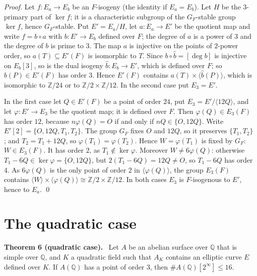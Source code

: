 \documentclass[11pt]{article}
\newenvironment{statement}[1]{\par\medskip\noindent\phantomsection\textbf{#1}\ }{\par\medskip}
\newcommand{\Q}{\mathbb Q}
\newcommand{\Z}{\mathbb Z}
\begin{document}
\emph{Proof.} Let \(f\colon E_a\to E_b\) be an \(F\)-isogeny (the identity if \(E_a=E_b\)). Let \(H\) be the
\(3\)-primary part of \(\ker f\); it is a characteristic subgroup of the \(G_F\)-stable group \(\ker f\), hence
\(G_F\)-stable. Put \(E'=E_a/H\), let \(a\colon E_a\to E'\) be the quotient map and write \(f=b\circ a\) with
\(b\colon E'\to E_b\) defined over \(F\); the degree of \(a\) is a power of \(3\) and the degree of \(b\) is prime
to \(3\). The map \(a\) is injective on the points of \(2\)-power order, so \(a(T)\subseteq E'(F)\) is isomorphic
to \(T\). Since \(b\circ\hat b=[\deg b]\) is injective on \(E_b[3]\), so is the dual isogeny
\(\hat b\colon E_b\to E'\), which is defined over \(F\); so \(\hat b(P)\in E'(F)\) has order \(3\). Hence \(E'(F)\)
contains \(a(T)\times\langle\hat b(P)\rangle\), which is isomorphic to \(\Z/24\) or to \(\Z/2\times\Z/12\). In the
second case put \(E_3=E'\).

In the first case let \(Q\in E'(F)\) be a point of order \(24\), put \(E_3=E'/\langle12Q\rangle\), and let
\(\varphi\colon E'\to E_3\) be the quotient map; it is defined over \(F\). Then \(\varphi(Q)\in E_3(F)\) has order
\(12\), because \(n\varphi(Q)=O\) if and only if \(nQ\in\{O,12Q\}\). Write \(E'[2]=\{O,12Q,T_1,T_2\}\). The group
\(G_F\) fixes \(O\) and \(12Q\), so it preserves \(\{T_1,T_2\}\); and \(T_2=T_1+12Q\), so
\(\varphi(T_1)=\varphi(T_2)\). Hence \(W=\varphi(T_1)\) is fixed by \(G_F\): \(W\in E_3(F)\). It has order \(2\),
as \(T_1\notin\ker\varphi\). Moreover \(W\neq6\varphi(Q)\): otherwise \(T_1-6Q\in\ker\varphi=\{O,12Q\}\), but
\(2(T_1-6Q)=12Q\neq O\), so \(T_1-6Q\) has order \(4\). As \(6\varphi(Q)\) is the only point of order \(2\) in
\(\langle\varphi(Q)\rangle\), the group \(E_3(F)\) contains
\(\langle W\rangle\times\langle\varphi(Q)\rangle\cong\Z/2\times\Z/12\). In both cases \(E_3\) is \(F\)-isogenous
to \(E'\), hence to \(E_a\). \qed

\section{The quadratic case}\label{quadratic}

\begin{statement}{Theorem 6 (quadratic case).}\label{thm-quadratic}
Let \(A\) be an abelian surface over \(\Q\) that is simple over \(\Q\), and \(K\) a quadratic field such that
\(A_K\) contains an elliptic curve \(E\) defined over \(K\). If \(A(\Q)\) has a point of order \(3\), then
\(\#A(\Q)[2^\infty]\le16\).
\end{statement}
\end{document}
